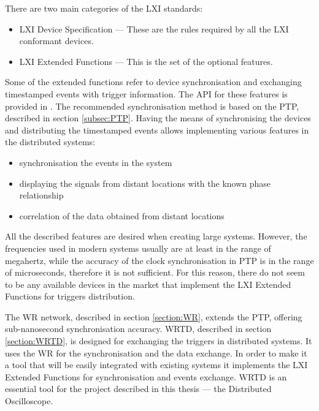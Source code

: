     There are two main categories of the LXI standards:
    \begin{itemize}
        \item LXI Device Specification --- These are the rules required by all the LXI conformant devices.
        \item LXI Extended Functions --- This is the set of the optional features.
    \end{itemize}
    
    Some of the extended functions refer to device synchronisation and exchanging timestamped events with trigger information. The API for these features is provided in \cite{specification:IVI_LXI_Sync}. The recommended synchronisation method is based on the PTP, described in section \ref{subsec:PTP}. 
    Having the means of synchronising the devices and distributing the timestamped events allows implementing various features in the distributed systems:
    \begin{itemize}
        \item synchronisation the events in the system
        \item displaying the signals from distant locations with the known phase relationship
        \item correlation of the data obtained from distant locations
    \end{itemize}
    All the described features are desired when creating large systems. However, the frequencies used in modern systems usually are at least in the range of megahertz, while the accuracy of the clock synchronisation in PTP is in the range of microseconds, therefore it is not sufficient. For this reason, there do not seem to be any available devices in the market that implement the LXI Extended Functions for triggers distribution.
    
    The WR network, described in section \ref{section:WR}, extends the PTP, offering sub-nanosecond synchronisation accuracy. WRTD, described in section \ref{section:WRTD}, is designed for exchanging the triggers in distributed systems. It uses the WR for the synchronisation and the data exchange. In order to make it a tool that will be easily integrated with existing systems it implements the LXI Extended Functions for synchronisation and events exchange. WRTD is an essential tool for the project described in this thesis --- the Distributed Oscilloscope.

